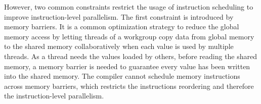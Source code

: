 \documentclass{article}
\begin{document}







However, two common constraints restrict the usage of instruction scheduling to improve instruction-level parallelism. The first constraint is introduced by memory barriers. It is a common optimization strategy to reduce the global memory access by letting threads of a workgroup copy data from global memory to the shared memory collaboratively when each value is used by multiple threads. As a thread needs the values loaded by others, before reading the shared memory, a memory barrier is needed to guarantee every value has been written into the shared memory. The compiler cannot schedule memory instructions across memory barriers, which restricts the instructions reordering and therefore the instruction-level parallelism.
\end{document}
